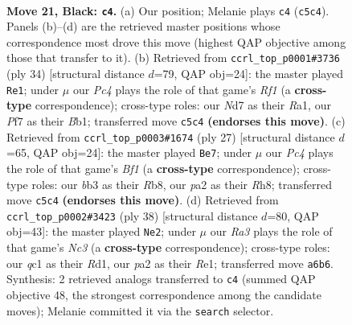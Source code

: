 \documentclass[11pt]{article}
\begin{document}
\clearpage

\begin{figure}[p]\centering
\begin{subfigure}{0.46\textwidth}\centering
\resizebox{\linewidth}{!}{%
\newchessgame
\chessboard[
  setfen={2r3k1/1bqn1p1p/r4bp1/pppPp1B1/4P3/1BP3P1/P3KP1P/R1Q3NR b - - 7 21},
  showmover=false,
  pgfstyle=straightmove, color=movearrow, markmove={c5-c4}
]}
\caption{}
\end{subfigure}\hfill
\begin{subfigure}{0.46\textwidth}\centering
\resizebox{\linewidth}{!}{%
\newchessgame
\chessboard[
  setfen={2r1k2r/1pqbbpp1/p3p2p/4P2P/1npP4/2B2N2/PP3PP1/RB1Q1RK1 w k - 0 18},
  showmover=false,
  pgfstyle=straightmove, color=movearrow, markmove={f1-e1}
]}
\caption{}
\end{subfigure}
\\[4pt]
\begin{subfigure}{0.46\textwidth}\centering
\resizebox{\linewidth}{!}{%
\newchessgame
\chessboard[
  setfen={1r2kb1r/1p1n1pp1/p2p1q2/N2Ppb1p/2P5/3BBP2/PP1Q2PP/R3K2R b KQk - 2 14},
  showmover=false,
  pgfstyle=straightmove, color=movearrow, markmove={f8-e7}
]}
\caption{}
\end{subfigure}\hfill
\begin{subfigure}{0.46\textwidth}\centering
\resizebox{\linewidth}{!}{%
\newchessgame
\chessboard[
  setfen={3rr1k1/pb1nqp1p/1ppp2p1/4b3/2PBP3/2N2P2/PPQ3PP/3RRBK1 w - - 1 20},
  showmover=false,
  pgfstyle=straightmove, color=movearrow, markmove={c3-e2}
]}
\caption{}
\end{subfigure}
\caption{\textbf{Move 21, Black: \texttt{c4}.} (a) Our position; Melanie plays \texttt{c4} (\texttt{c5c4}). Panels (b)--(d) are the retrieved master positions whose correspondence most drove this move (highest QAP objective among those that transfer to it). (b) Retrieved from \texttt{ccrl\_top\_p0001\#3736} (ply 34) [structural distance $d$=79, QAP obj=24]: the master played \texttt{Re1}; under $\mu$ our \emph{Pc4} plays the role of that game's \emph{Rf1} (a \textbf{cross-type} correspondence); cross-type roles: our \emph{N}d7 as their \emph{R}a1, our \emph{P}f7 as their \emph{B}b1; transferred move \texttt{c5c4} \textbf{(endorses this move)}. (c) Retrieved from \texttt{ccrl\_top\_p0003\#1674} (ply 27) [structural distance $d$=65, QAP obj=24]: the master played \texttt{Be7}; under $\mu$ our \emph{Pc4} plays the role of that game's \emph{Bf1} (a \textbf{cross-type} correspondence); cross-type roles: our \emph{b}b3 as their \emph{R}b8, our \emph{p}a2 as their \emph{R}h8; transferred move \texttt{c5c4} \textbf{(endorses this move)}. (d) Retrieved from \texttt{ccrl\_top\_p0002\#3423} (ply 38) [structural distance $d$=80, QAP obj=43]: the master played \texttt{Ne2}; under $\mu$ our \emph{Ra3} plays the role of that game's \emph{Nc3} (a \textbf{cross-type} correspondence); cross-type roles: our \emph{q}c1 as their \emph{R}d1, our \emph{p}a2 as their \emph{R}e1; transferred move \texttt{a6b6}. Synthesis: 2 retrieved analogs transferred to \texttt{c4} (summed QAP objective 48, the strongest correspondence among the candidate moves); Melanie committed it via the \texttt{search} selector.}
\label{fig:thought-m41}
\end{figure}
\end{document}
